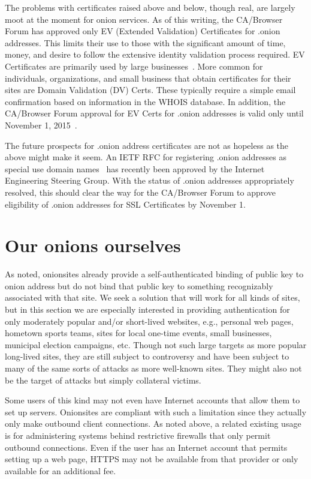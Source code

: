 \documentclass[10pt, conference, compsocconf]{styles/IEEEtran}
\begin{document}
The problems with certificates raised above and below, though real,
are largely moot at the moment for onion services. As of this writing,
the CA/Browser Forum has approved only EV (Extended Validation)
Certificates for .onion addresses. This limits their use to those with
the significant amount of time, money, and desire to follow the
extensive identity validation process required.  EV Certificates are
primarily used by large businesses~\cite{wikipedia-ev}. More common
for individuals, organizations, and small business that obtain
certificates for their sites are Domain Validation (DV) Certs. These
typically require a simple email confirmation based on information in
the WHOIS database.  In addition, the CA/Browser Forum approval for EV
Certs for .onion addresses is valid only until November 1,
2015~\cite{cab-ballot144}.

The future prospects for .onion address certificates are not as
hopeless as the above might make it seem.  An IETF RFC for registering
.onion addresses as special use domain names~\cite{ietf-onion-tld-rfc}
has recently been approved by the Internet Engineering Steering Group.
With the status of .onion addresses appropriately resolved, this should
clear the way for the CA/Browser Forum to approve eligibility of .onion
addresses for SSL Certificates by November 1.


\section{Our onions ourselves}
\label{ourselves}

As noted, onionsites already provide a self-authenticated binding of
public key to onion address but do not bind that public key to
something recognizably associated with that site.  We seek a solution
that will work for all kinds of sites, but in this section we are
especially interested in providing authentication for only moderately
popular and/or short-lived websites, e.g., personal web pages,
hometown sports teams, sites for local one-time events, small
businesses, municipal election campaigns, etc.  Though not such large
targets as more popular long-lived sites, they are still subject to
controversy and have been subject to many of the same sorts of attacks
as more well-known sites.  They might also not be the target of
attacks but simply collateral victims.

Some users of this kind may not even have Internet accounts that allow
them to set up servers. Onionsites are compliant with such a
limitation since they actually only make outbound client
connections. As noted above, a related existing usage is for
administering systems behind restrictive firewalls that only permit
outbound connections.  Even if the user has an Internet account that
permits setting up a web page, HTTPS may not be available from that
provider or only available for an additional fee.
\end{document}
